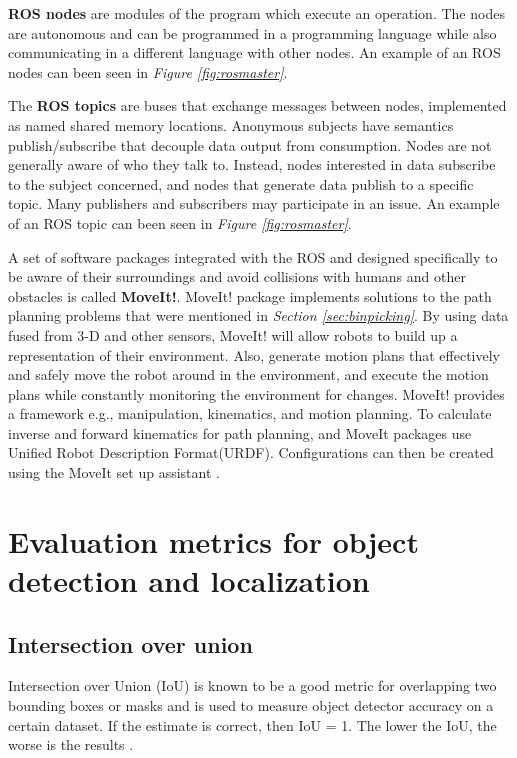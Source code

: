 \textbf{ROS nodes} are modules of the program which execute an operation. 
The nodes are autonomous and can be programmed in a programming language while also communicating in a different language with other nodes\cite{meier_understanding_2019}. An example of an ROS nodes can been seen in \textit{Figure \ref{fig:rosmaster}}.


The \textbf{ROS topics} are buses that exchange messages between nodes, implemented as named shared memory locations. Anonymous subjects have semantics publish/subscribe that decouple data output from consumption. Nodes are not generally aware of who they talk to. Instead, nodes interested in data subscribe to the subject concerned, and nodes that generate data publish to a specific topic. Many publishers and subscribers may participate in an issue\cite{foote_topics_2019}. An example of an ROS topic can been seen in \textit{Figure \ref{fig:rosmaster}}.

A set of software packages integrated with the ROS and designed specifically to be aware of their surroundings and avoid collisions with humans and other obstacles is called \textbf{MoveIt!}. MoveIt! package implements solutions to the path planning problems that were mentioned in \textit{Section \ref{sec:binpicking}}. 
By using data fused from 3-D and other sensors, MoveIt! will allow robots to build up a representation of their environment. Also, generate motion plans that effectively and safely move the robot around in the environment, and execute the motion plans while constantly monitoring the environment for changes. 
MoveIt! provides a framework e.g., manipulation, kinematics, and motion planning. To calculate inverse and forward kinematics for path planning, and MoveIt packages use Unified Robot Description Format(URDF). Configurations can then be created using the MoveIt set up assistant \cite{chitta_moveit_2012}.

\section{Evaluation metrics for object detection and localization}
\subsection{Intersection over union}
Intersection over Union (IoU) is known to be a good metric for overlapping two bounding boxes or masks and is used to measure object detector accuracy on a certain dataset. If the estimate is correct, then IoU = 1. The lower the IoU, the worse is the results \cite{sheremet_intersection_2020}.

